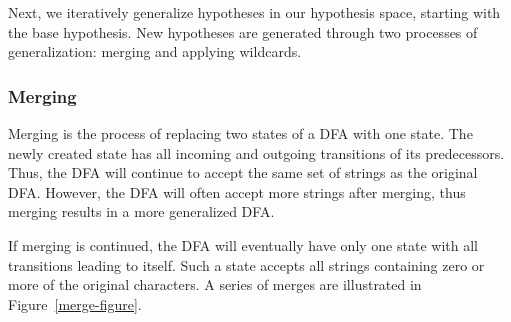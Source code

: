 \documentclass[10pt,letterpaper]{article}
\begin{document}
Next, we iteratively generalize hypotheses in our hypothesis space, starting with the base hypothesis. New hypotheses are generated through two processes of generalization: merging and applying wildcards.


\subsubsection{Merging} Merging is the process of replacing two states of a DFA with one state. The newly created state has all incoming and outgoing transitions of its predecessors. Thus, the DFA will continue to accept the same set of strings as the original DFA. However, the DFA will often accept more strings after merging, thus merging results in a more generalized DFA.

If merging is continued, the DFA will eventually have only one state with all transitions leading to itself. Such a state accepts all strings containing zero or more of the original characters. A series of merges are illustrated in Figure~\ref{merge-figure}.
\end{document}
